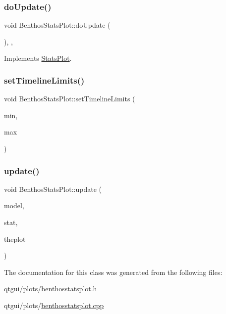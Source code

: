 \subsubsection{\texorpdfstring{doUpdate()}{doUpdate()}}
{\footnotesize\ttfamily void Benthos\+Stats\+Plot\+::do\+Update (\begin{DoxyParamCaption}{ }\end{DoxyParamCaption})\hspace{0.3cm}{\ttfamily [override]}, {\ttfamily [protected]}, {\ttfamily [virtual]}}



Implements \mbox{\hyperlink{class_stats_plot_a363a428cc00b389a55a03e6d5d7c526e}{Stats\+Plot}}.

\mbox{\label{class_benthos_stats_plot_af4fefaf33fad2c8c42e4e9e4e9f0bc1e}} 
\subsubsection{\texorpdfstring{setTimelineLimits()}{setTimelineLimits()}}
{\footnotesize\ttfamily void Benthos\+Stats\+Plot\+::set\+Timeline\+Limits (\begin{DoxyParamCaption}\item[{double}]{min,  }\item[{double}]{max }\end{DoxyParamCaption})\hspace{0.3cm}{\ttfamily [inline]}}

\mbox{\label{class_benthos_stats_plot_a2c1b83966f578af87a58163be92411db}} 
\subsubsection{\texorpdfstring{update()}{update()}}
{\footnotesize\ttfamily void Benthos\+Stats\+Plot\+::update (\begin{DoxyParamCaption}\item[{\mbox{\hyperlink{class_displace_model}{Displace\+Model}} $\ast$}]{model,  }\item[{\mbox{\hyperlink{namespacedisplace_1_1plot_a3a91ceda6f3e5855d0e7cf97e8dea045}{displace\+::plot\+::\+Benthos\+Stat}}}]{stat,  }\item[{\mbox{\hyperlink{class_q_custom_plot}{Q\+Custom\+Plot}} $\ast$}]{theplot }\end{DoxyParamCaption})}



The documentation for this class was generated from the following files\+:\begin{DoxyCompactItemize}
\item 
qtgui/plots/\mbox{\hyperlink{benthosstatsplot_8h}{benthosstatsplot.\+h}}\item 
qtgui/plots/\mbox{\hyperlink{benthosstatsplot_8cpp}{benthosstatsplot.\+cpp}}\end{DoxyCompactItemize}
